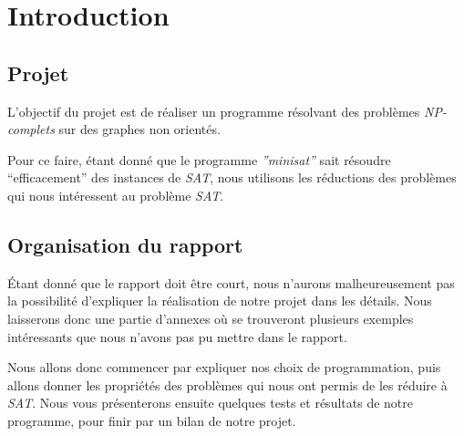  \section{Introduction}

  \subsection{Projet}
  L'objectif du projet est de réaliser un programme résolvant des
  problèmes \emph{NP-complets} sur des graphes non orientés.

  Pour ce faire, étant donné que le programme \emph{''minisat''} sait
  résoudre ``efficacement'' des instances de \emph{SAT}, nous utilisons
  les réductions des problèmes qui nous intéressent au problème
  \emph{SAT}.

  \subsection{Organisation du rapport}
  Étant donné que le rapport doit être court, nous n'aurons
  malheureusement pas la possibilité d'expliquer la réalisation de notre
  projet dans les détails. Nous laisserons donc une partie d'annexes où
  se trouveront plusieurs exemples intéressants que nous n'avons pas pu
  mettre dans le rapport.

  Nous allons donc commencer par expliquer nos choix de programmation,
  puis allons donner les propriétés des problèmes qui nous ont permis de
  les réduire à \emph{SAT}. Nous vous présenterons ensuite quelques
  tests et résultats de notre programme, pour finir par un bilan de
  notre projet.